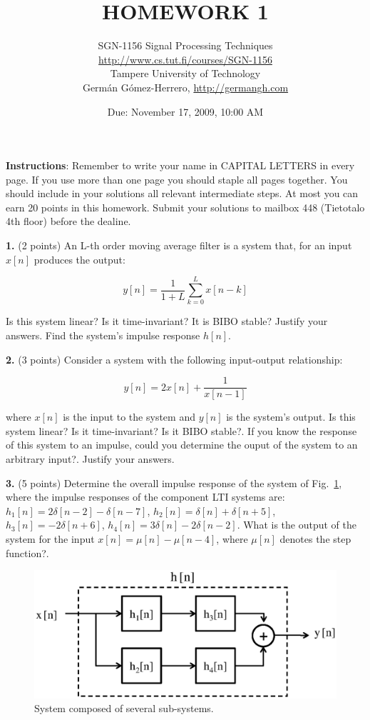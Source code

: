 \documentclass[a4paper,11pt,oneside]{article}
\title{\large{\textbf{HOMEWORK 1}}}
\author{SGN-1156 Signal Processing Techniques\\
\url{http://www.cs.tut.fi/courses/SGN-1156}\\
Tampere University of Technology\\
Germ\'an G\'omez-Herrero, \url{http://germangh.com}}
\date{Due: November 17, 2009, 10:00 AM}
\begin{document}
\maketitle

\noindent \textbf{Instructions}: Remember to write your name in CAPITAL LETTERS in every page. If you use more than one page you should staple all pages together. You should include in your solutions all relevant intermediate steps. At most you can earn 20 points in this homework. Submit your solutions to mailbox 448 (Tietotalo 4th floor) before the dealine.
\vspace{2cm} 

\noindent \textbf{1.} (2 points) An L-th order moving average filter is a system that, for an input $x[n]$ produces the output:

\[
y[n] = \frac{1}{1+L}\sum_{k=0}^{L}x[n-k]
\]

\noindent Is this system linear? Is it time-invariant?  It is BIBO stable? Justify your answers. Find the system's impulse response $h[n]$.

\vspace{1cm}

\noindent \textbf{2.} (3 points) Consider a system with the following input-output relationship:

\[
y[n] = 2x[n]+\frac{1}{x[n-1]}
\]

where $x[n]$ is the input to the system and $y[n]$ is the system's output. Is this system linear? Is it time-invariant? Is it BIBO stable?. If you know the response of this system to an impulse, could you determine the ouput of the system to an arbitrary input?. Justify your answers. 


\vspace{1cm}

\noindent \textbf{3.} (5 points) Determine the overall impulse response of the system of Fig.~\ref{fig1}, where the impulse responses of the component LTI systems are: $h_1[n]=2\delta[n-2]-\delta[n-7]$, $h_2[n]=\delta[n]+\delta[n+5]$, $h_3[n]=-2\delta[n+6]$, $h_4[n]=3\delta[n]-2\delta[n-2]$.  What is the output of the system for the input $x[n]=\mu[n]-\mu[n-4]$, where $\mu[n]$ denotes the step function?.


\begin{figure}[h!]
\centering
\includegraphics[width=.8\textwidth]{fig1.eps}
\caption{System composed of several sub-systems.}
\label{fig1}
\end{figure}
\end{document}
